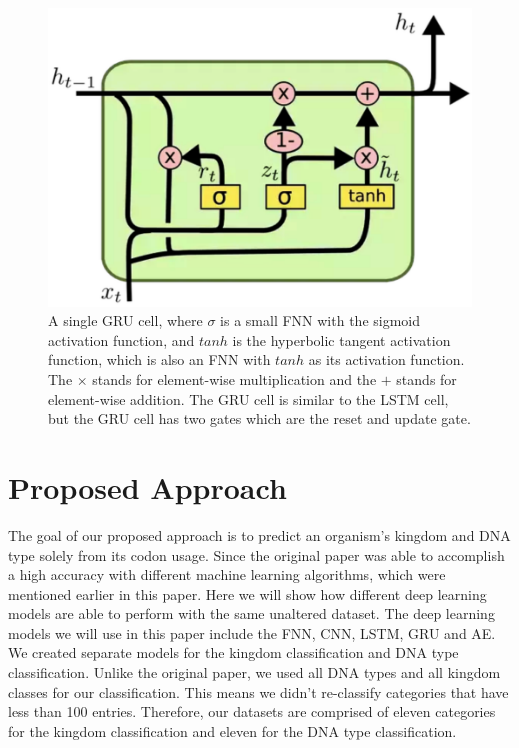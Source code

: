 \documentclass[conference]{IEEEtran}
\begin{document}
\begin{figure}[htbp]
\centerline{\includegraphics[scale=0.285]{GRU}}
\caption{A single GRU cell, where $\sigma$ is a small FNN with the sigmoid activation function\cite{Nwankpa}, and $tanh$ is the hyperbolic tangent activation function\cite{Nwankpa}, which is also an FNN 
with $tanh$ as its activation function. The $\times$ stands for element-wise multiplication and the $+$ stands for element-wise addition. The GRU cell is similar to the LSTM cell, but the GRU cell has two gates which are the reset and update gate.}
\label{fig}
\end{figure}


\section{Proposed Approach}
The goal of our proposed approach is to predict an organism’s kingdom and DNA type solely from its codon usage. Since the original paper was able to accomplish a high accuracy with different machine learning algorithms, which were mentioned earlier in this paper. Here we will show how different deep learning models are able to perform with the same unaltered dataset. The deep learning models we will use in this paper include the FNN, CNN, LSTM, GRU and AE. We created separate models for the kingdom classification and DNA type classification. Unlike the original paper, we used all DNA types and all kingdom classes for our classification. This means we didn’t re-classify categories that have less than 100 entries. Therefore, our datasets are comprised of eleven categories for the kingdom classification and eleven for the DNA type classification. 
\end{document}
